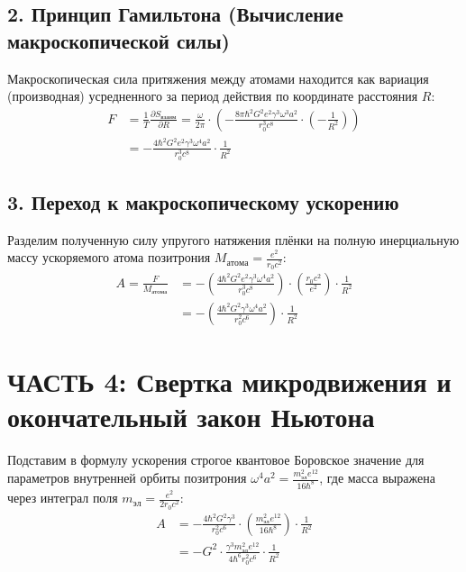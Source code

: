 \documentclass[12pt,a4paper]{article}
\begin{document}
\subsection*{2. Принцип Гамильтона (Вычисление макроскопической силы)}

Макроскопическая сила притяжения между атомами находится как вариация (производная) усредненного за период действия по координате расстояния $R$:
\begin{align}
F &= \frac{1}{T} \frac{\partial S_{взаим}}{\partial R} = \frac{\omega}{2\pi} \cdot \left( - \frac{8\pi \hbar^2 G^2 e^2 \gamma^3 \omega^3 a^2}{r_0^3 c^8} \cdot \left( -\frac{1}{R^2}\right) \right) \\
&= - \frac{4 \hbar^2 G^2 e^2 \gamma^3 \omega^4 a^2}{r_0^3 c^8} \cdot \frac{1}{R^2}
\end{align}

\subsection*{3. Переход к макроскопическому ускорению}

Разделим полученную силу упругого натяжения плёнки на полную инерциальную массу ускоряемого атома позитрония $M_{атома} = \frac{e^2}{r_0 c^2}$:
\begin{align}
A = \frac{F}{M_{атома}} &= - \left( \frac{4 \hbar^2 G^2 e^2 \gamma^3 \omega^4 a^2}{r_0^3 c^8} \right) \cdot \left( \frac{r_0 c^2}{e^2} \right) \cdot \frac{1}{R^2} \\
&= - \left( \frac{4 \hbar^2 G^2 \gamma^3 \omega^4 a^2}{r_0^2 c^6} \right) \cdot \frac{1}{R^2}
\end{align}

\section*{ЧАСТЬ 4: Свертка микродвижения и окончательный закон Ньютона}

Подставим в формулу ускорения строгое квантовое Боровское значение для параметров внутренней орбиты позитрония $\omega^4 a^2 = \frac{m_{эл}^2 e^{12}}{16 \hbar^8}$, где масса выражена через интеграл поля $m_{эл} = \frac{e^2}{2r_0 c^2}$:
\begin{align}
A &= - \frac{4 \hbar^2 G^2 \gamma^3}{r_0^2 c^6} \cdot \left( \frac{m_{эл}^2 e^{12}}{16 \hbar^8} \right) \cdot \frac{1}{R^2} \\
&= - G^2 \cdot \frac{\gamma^3 m_{эл}^2 e^{12}}{4 \hbar^6 r_0^2 c^6} \cdot \frac{1}{R^2}
\end{align}
\end{document}
